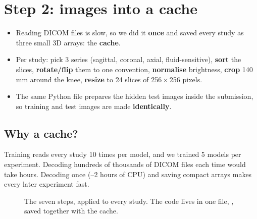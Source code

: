 \chapter{Step 2: images into a cache}
\label{ch:cache}

\begin{tldr}
\begin{itemize}
\item Reading DICOM files is slow, so we did it \textbf{once} and saved every study as three small 3D arrays: the
      \textbf{cache}.
\item Per study: pick 3 series (sagittal, coronal, axial, fluid-sensitive), \textbf{sort} the slices,
      \textbf{rotate/flip} them to one convention, \textbf{normalise} brightness, \textbf{crop} 140\,mm around the knee,
      \textbf{resize} to 24 slices of 256\,$\times$\,256 pixels.
\item The same Python file prepares the hidden test images inside the submission, so training and test images are
      made \textbf{identically}.
\end{itemize}
\end{tldr}

\section{Why a cache?}

Training reads every study 10 times per model, and we trained 5 models per experiment. Decoding hundreds of thousands of
DICOM files each time would take hours. Decoding once (--2 hours of CPU) and saving compact arrays makes every
later experiment fast.

\begin{figure}[H]
\centering
{}
\caption{The seven steps, applied to every study. The code lives in one file, , saved together
with the cache.}
\label{fig:cacheflow}
\end{figure}

